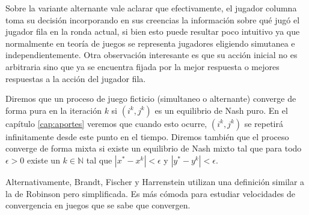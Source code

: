Sobre la variante alternante vale aclarar que efectivamente, el jugador columna toma su decisión incorporando en sus creencias la información sobre qué jugó el jugador fila en la ronda actual, si bien esto puede resultar poco intuitivo ya que normalmente en teoría de juegos se representa jugadores eligiendo simutanea e independientemente. Otra observación interesante es que su acción inicial no es arbitraria sino que ya se encuentra fijada por la mejor respuesta o mejores respuestas a la acción del jugador fila.

Diremos que un proceso de juego ficticio (simultaneo o alternante) converge de forma pura en la iteración $k$ si $(i^k, j^k)$ es un equilibrio de Nash puro. En el capítulo \ref{cap:aportes} veremos que cuando esto ocurre, $(i^k, j^k)$ se repetirá infinitamente desde este punto en el tiempo. Diremos también que el proceso converge de forma mixta si existe un equilibrio de Nash mixto tal que para todo $\epsilon > 0$ existe un $k \in \mathbb{N}$ tal que $|x^* - x^k| < \epsilon$ y $|y^* - y^k| < \epsilon$. 


Alternativamente, Brandt, Fischer y Harrenstein utilizan una definición similar a la de Robinson \cite{robinson:zerosum} pero simplificada. Es más cómoda para estudiar velocidades de convergencia en juegos que se sabe que convergen.

